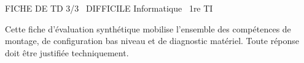 \documentclass[11pt]{article}
\begin{document}
\begin{tcolorbox}[enhanced,colback=popink,colframe=popink,arc=10pt,boxrule=0pt,left=12pt,right=12pt,top=9pt,bottom=9pt]
{\color{white}\popxbold\small FICHE DE TD 3/3 \textbullet\ DIFFICILE \hfill Informatique \textbullet\ 1re TI\par}
\end{tcolorbox}
\vspace{4pt}
Cette fiche d'évaluation synthétique mobilise l'ensemble des compétences de montage, de configuration bas niveau et de diagnostic matériel. Toute réponse doit être justifiée techniquement.
\end{document}
